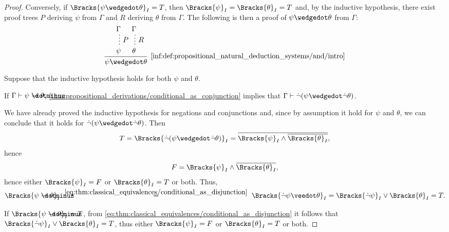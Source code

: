 \begin{proof}
  \NecessitySubProof* Conversely, if \( \Bracks{\psi \synwedge \theta}_I = T \), then \( \Bracks{\psi}_I = \Bracks{\theta}_I = T \) and, by the inductive hypothesis, there exist proof trees \( P \) deriving \( \psi \) from \( \Gamma \) and \( R \) deriving \( \theta \) from \( \Gamma \). The following is then a proof of \( \psi \synwedge \theta \) from \( \Gamma \):
  \begin{equation*}
    \begin{prooftree}
      \hypo{ \Gamma }
      \ellipsis {\( P \)} { \psi }

      \hypo{ \Gamma }
      \ellipsis {\( R \)} { \theta }

      \infer2[\ref{inf:def:propositional_natural_deduction_systems/and/intro}]{ \psi \synwedge \theta }
    \end{prooftree}
  \end{equation*}

   Suppose that the inductive hypothesis holds for both \( \psi \) and \( \theta \).

  \SufficiencySubProof* If \( \Gamma \vdash \psi \synimplies \theta \), \cref{thm:propositional_derivations/conditional_as_conjunction} implies that \( \Gamma \vdash \synneg(\psi \synwedge \synneg \theta) \).

  We have already proved the inductive hypothesis for negations and conjunctions and, since by assumption it hold for \( \psi \) and \( \theta \), we can conclude that it holds for \( \synneg(\psi \synwedge \synneg \theta) \). Then
  \begin{equation*}
    T
    =
    \Bracks{\synneg(\psi \synwedge \synneg \theta)}_I
    =
    \oline{\Bracks{\psi}_I \wedge \oline{\Bracks{\theta}_I}},
  \end{equation*}
  hence
  \begin{equation*}
    F = \Bracks{\psi}_I \wedge \oline{\Bracks{\theta}_I},
  \end{equation*}
  hence either \( \Bracks{\psi}_I = F \) or \( \Bracks{\theta}_I = T \) or both. Thus,
  \begin{equation*}
    \Bracks{\psi \synimplies \theta}_I
    \reloset {\eqref{eq:thm:classical_equivalences/conditional_as_disjunction}} =
    \Bracks{\synneg \psi \synvee \theta}_I
    =
    \Bracks{\synneg \psi}_I \vee \Bracks{\theta}_I
    =
    T.
  \end{equation*}

  \NecessitySubProof* If \( \Bracks{\psi \synimplies \theta}_I = T \), from \eqref{eq:thm:classical_equivalences/conditional_as_disjunction} it follows that \( \Bracks{\synneg \psi}_I \vee \Bracks{\theta}_I = T \), thus either \( \Bracks{\psi}_I = F \) or \( \Bracks{\theta}_I = T \) or both.


\end{proof}
